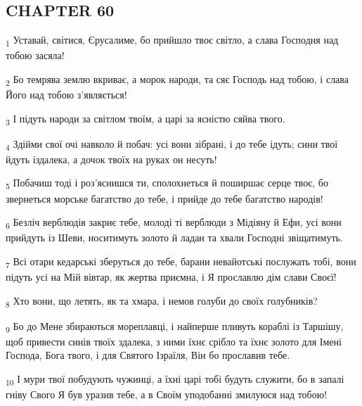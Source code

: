 \subsection{CHAPTER 60}
\begin{tcolorbox}
\textsubscript{1} Уставай, світися, Єрусалиме, бо прийшло твоє світло, а слава Господня над тобою засяла!
\end{tcolorbox}
\begin{tcolorbox}
\textsubscript{2} Бо темрява землю вкриває, а морок народи, та сяє Господь над тобою, і слава Його над тобою з'являється!
\end{tcolorbox}
\begin{tcolorbox}
\textsubscript{3} І підуть народи за світлом твоїм, а царі за ясністю сяйва твого.
\end{tcolorbox}
\begin{tcolorbox}
\textsubscript{4} Здійми свої очі навколо й побач: усі вони зібрані, і до тебе ідуть; сини твої йдуть іздалека, а дочок твоїх на руках он несуть!
\end{tcolorbox}
\begin{tcolorbox}
\textsubscript{5} Побачиш тоді і роз'яснишся ти, сполохнеться й поширшає серце твоє, бо звернеться морське багатство до тебе, і прийде до тебе багатство народів!
\end{tcolorbox}
\begin{tcolorbox}
\textsubscript{6} Безліч верблюдів закриє тебе, молоді ті верблюди з Мідіяну й Ефи, усі вони прийдуть із Шеви, носитимуть золото й ладан та хвали Господні звіщатимуть.
\end{tcolorbox}
\begin{tcolorbox}
\textsubscript{7} Всі отари кедарські зберуться до тебе, барани невайотські послужать тобі, вони підуть усі на Мій вівтар, як жертва приємна, і Я прославлю дім слави Своєї!
\end{tcolorbox}
\begin{tcolorbox}
\textsubscript{8} Хто вони, що летять, як та хмара, і немов голуби до своїх голубників?
\end{tcolorbox}
\begin{tcolorbox}
\textsubscript{9} Бо до Мене збираються мореплавці, і найперше пливуть кораблі із Таршішу, щоб привести синів твоїх здалека, з ними їхнє срібло та їхнє золото для Імені Господа, Бога твого, і для Святого Ізраїля, Він бо прославив тебе.
\end{tcolorbox}
\begin{tcolorbox}
\textsubscript{10} І мури твої побудують чужинці, а їхні царі тобі будуть служити, бо в запалі гніву Свого Я був уразив тебе, а в Своїм уподобанні змилуюся над тобою!
\end{tcolorbox}
